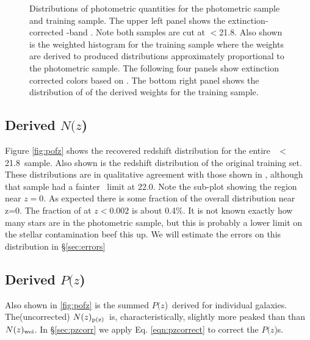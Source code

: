 \documentclass[preprint]{aastex}
\newcommand{\rmax}{21.8}
\newcommand{\pofz}{$P(z$)}
\newcommand{\Nofz}{$N(z$)}
\newcommand{\nwei}{N(z)_{\rm wei}}
\newcommand{\npz}{N(z)_{\rm p(z)}}
\begin{document}
\begin{figure}[p] \centering

    \caption{Distributions of photometric quantities for the photometric sample
    and training sample.  The upper left panel shows the extinction-corrected
    \rmag-band \cmodelmag.  Note both samples are cut at \rmag$ < $\rmax.  
    Also shown is the weighted histogram for the training sample where
    the weights are derived to produced distributions approximately 
    proportional to the photometric sample.
    The following four panels show extinction corrected colors based on
    \modelmag.  The bottom right panel shows the distribution of of the
    derived weights for the training sample. }
    \label{fig:varhist}

    \vspace{2em}
\end{figure}

\subsection{Derived \Nofz}

Figure \ref{fig:pofz} shows the recovered redshift distribution for the entire
\rmag\ $<$ \rmax\ sample.  Also shown is the redshift distribution of the
original training set.  These distributions are in qualitative agreement with
those shown in \citet{CunhaPhotoz09}, although that sample had a fainter \rmag\
limit at 22.0.  Note the sub-plot showing the region near $z=0$.  As expected
there is some fraction of the overall distribution near z=0.  The fraction of
at $z < 0.002$ is about 0.4\%.  It is not known exactly how many stars are in
the photometric sample, but this is probably a lower limit on the stellar
contamination {\color{red}beef this up}.  We will estimate the errors
on this distribution in \S \ref{sec:errors}

\subsection{Derived \pofz}

Also shown in \ref{fig:pofz} is the summed \pofz\ derived for individual
galaxies.  The(uncorrected) $\npz$\ is, characteristically, slightly more peaked than
than $\nwei$.
In \S \ref{sec:pzcorr} we apply Eq. \ref{eqn:pzcorrect} to correct the \pofz s.
\end{document}
